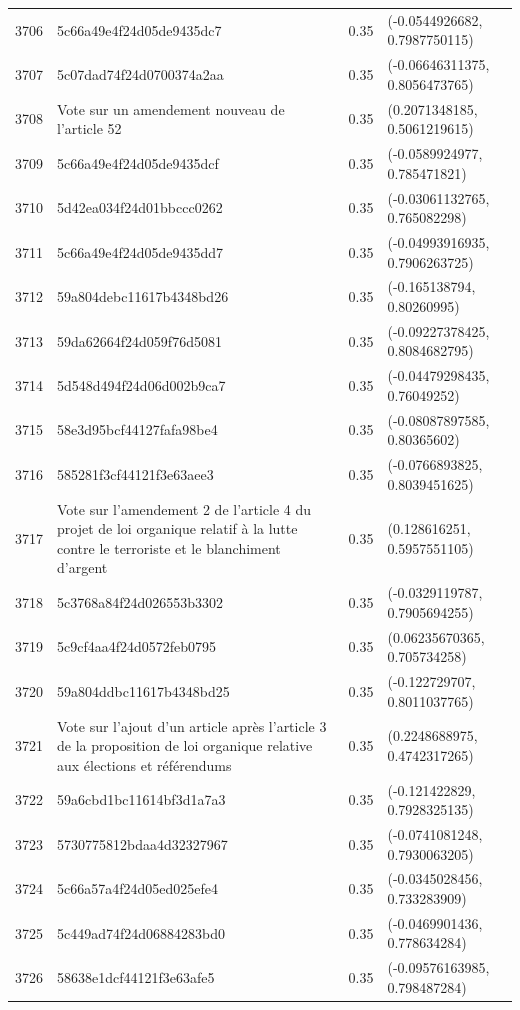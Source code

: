 \begin{table}[ht]
\begin{tabular}{rlrl}
  3706 & 5c66a49e4f24d05de9435dc7 & 0.35 & (-0.0544926682, 0.7987750115) \\ 
  3707 & 5c07dad74f24d0700374a2aa & 0.35 & (-0.06646311375, 0.8056473765) \\ 
  3708 & Vote sur un amendement nouveau de l'article 52 & 0.35 & (0.2071348185, 0.5061219615) \\ 
  3709 & 5c66a49e4f24d05de9435dcf & 0.35 & (-0.0589924977, 0.785471821) \\ 
  3710 & 5d42ea034f24d01bbccc0262 & 0.35 & (-0.03061132765, 0.765082298) \\ 
  3711 & 5c66a49e4f24d05de9435dd7 & 0.35 & (-0.04993916935, 0.7906263725) \\ 
  3712 & 59a804debc11617b4348bd26 & 0.35 & (-0.165138794, 0.80260995) \\ 
  3713 & 59da62664f24d059f76d5081 & 0.35 & (-0.09227378425, 0.8084682795) \\ 
  3714 & 5d548d494f24d06d002b9ca7 & 0.35 & (-0.04479298435, 0.76049252) \\ 
  3715 & 58e3d95bcf44127fafa98be4 & 0.35 & (-0.08087897585, 0.80365602) \\ 
  3716 & 585281f3cf44121f3e63aee3 & 0.35 & (-0.0766893825, 0.8039451625) \\ 
  3717 & Vote sur l'amendement 2 de l'article 4 du projet de loi organique relatif à la lutte contre le terroriste et le blanchiment d'argent & 0.35 & (0.128616251, 0.5957551105) \\ 
  3718 & 5c3768a84f24d026553b3302 & 0.35 & (-0.0329119787, 0.7905694255) \\ 
  3719 & 5c9cf4aa4f24d0572feb0795 & 0.35 & (0.06235670365, 0.705734258) \\ 
  3720 & 59a804ddbc11617b4348bd25 & 0.35 & (-0.122729707, 0.8011037765) \\ 
  3721 & Vote sur l'ajout d'un article après l'article 3 de la proposition de loi organique relative aux élections et référendums & 0.35 & (0.2248688975, 0.4742317265) \\ 
  3722 & 59a6cbd1bc11614bf3d1a7a3 & 0.35 & (-0.121422829, 0.7928325135) \\ 
  3723 & 5730775812bdaa4d32327967 & 0.35 & (-0.0741081248, 0.7930063205) \\ 
  3724 & 5c66a57a4f24d05ed025efe4 & 0.35 & (-0.0345028456, 0.733283909) \\ 
  3725 & 5c449ad74f24d06884283bd0 & 0.35 & (-0.0469901436, 0.778634284) \\ 
  3726 & 58638e1dcf44121f3e63afe5 & 0.35 & (-0.09576163985, 0.798487284) \\ 

\end{tabular}
\end{table}

